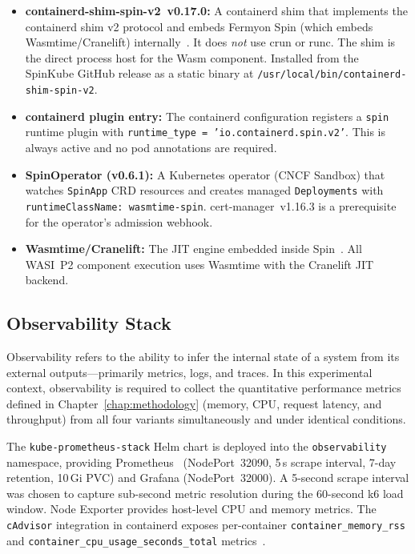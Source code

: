 \begin{itemize}
    \item \begin{sloppypar}\textbf{containerd-shim-spin-v2~v0.17.0:} A containerd shim that implements the containerd shim v2 protocol and embeds Fermyon Spin (which embeds Wasmtime/Cranelift) internally~\cite{spinkube2024, runwasi2024}. It does \textit{not} use crun or runc. The shim is the direct process host for the \acs{Wasm} component. Installed from the SpinKube GitHub release as a static binary at \texttt{/usr/local/bin/containerd-shim-spin-v2}.\end{sloppypar}
    \item \begin{sloppypar}\textbf{containerd plugin entry:} The containerd configuration registers a \texttt{spin} runtime plugin with \texttt{runtime\_type = 'io.containerd.spin.v2'}. This is always active and no pod annotations are required.\end{sloppypar}
    \item \begin{sloppypar}\textbf{SpinOperator (v0.6.1):} A Kubernetes operator (CNCF Sandbox) that watches \texttt{SpinApp} \acs{CRD} resources and creates managed \texttt{Deployments} with \texttt{runtimeClassName: wasmtime-spin}. cert-manager~v1.16.3 is a prerequisite for the operator's admission webhook.\end{sloppypar}
    \item \textbf{Wasmtime/Cranelift:} The \acs{JIT} engine embedded inside Spin~\cite{bytecodealliance2024wasmtime, fermyon2024spin}. All \acs{WASI}~P2 component execution uses Wasmtime with the Cranelift \acs{JIT} backend.
\end{itemize}

\subsection{Observability Stack}

Observability refers to the ability to infer the internal state of a system from its external outputs---primarily metrics, logs, and traces. In this experimental context, observability is required to collect the quantitative performance metrics defined in Chapter~\ref{chap:methodology} (memory, \acs{CPU}, request latency, and throughput) from all four variants simultaneously and under identical conditions.

\begin{sloppypar}
The \texttt{kube-prometheus-stack} Helm chart is deployed into the \texttt{observability} namespace, providing Prometheus~\cite{prometheus2024cncf} (NodePort~32090, 5\,s scrape interval, 7-day retention, 10\,Gi \acs{PVC}) and Grafana (NodePort~32000). A 5-second scrape interval was chosen to capture sub-second metric resolution during the 60-second k6 load window. Node Exporter provides host-level \acs{CPU} and memory metrics. The \texttt{cAdvisor} integration in containerd exposes per-container \texttt{container\_memory\_rss} and \texttt{container\_cpu\_usage\_seconds\_total} metrics~\cite{google2024cadvisor}.
\end{sloppypar}

